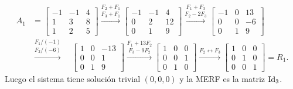 \begin{enumerate}[topsep=6pt, itemsep=.4cm]
\begin{align*}
A_1 &= \left[\begin{array}{ccc}
 -1&-1&4\\
 1&3&8\\
 1&2&5\end{array}\right] \stackrel{F_2+F_1}{\stackrel{F_3+F_1}{\longrightarrow}}   
 \left[\begin{array}{ccc}
 -1&-1&4\\
 0&2&12\\
 0&1&9\end{array}\right]\stackrel{F_1+F_3}{\stackrel{F_2-2F_3}{\longrightarrow}}  
 \left[\begin{array}{ccc}
 -1&0&13\\
 0&0&-6\\
 0&1&9\end{array}\right]  \\
 &\stackrel{F_1/(-1)}{\stackrel{F_2/(-6)}{\longrightarrow}}  \quad
 \left[\begin{array}{ccc}
 1&0&-13\\
 0&0&1\\
 0&1&9\end{array}\right]\stackrel{F_1+13F_2}{\stackrel{F_3-9F_2}{\longrightarrow}}   
 \left[\begin{array}{ccc}
1&0&0\\
 0&0&1\\
 0&1&0\end{array}\right]{\stackrel{F_2 \leftrightarrow F_3}{\longrightarrow}}   
  \left[\begin{array}{ccc}
1&0&0\\
 0&1&0\\
 0&0&1\end{array}\right] =R_1.
\end{align*}
Luego el sistema tiene solución trivial $(0,0,0)$ y la MERF es la matriz $\operatorname{Id}_3$.


\end{enumerate}
